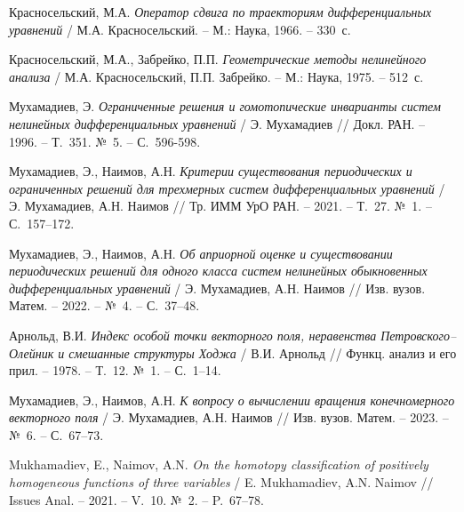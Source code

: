 \begin{thebibliography}{9} %

  Красносельский, М.А.   
{\it Оператор сдвига по траекториям дифференциальных уравнений}
/ М.А. Красносельский. --  М.: Наука, 1966. -- 330~с.

  Красносельский, М.А., Забрейко, П.П.    
{\it Геометрические методы нелинейного анализа}
/ М.А. Красносельский, П.П. Забрейко. --  М.: Наука, 1975. -- 512~с.

 Мухамадиев, Э. {\it Ограниченные решения и гомотопические
инварианты систем  нелинейных дифференциальных уравнений} 
/ Э. Мухамадиев // Докл. РАН. -- 1996. -- Т.~351. №~5. -- С.~596-598.

 Мухамадиев, Э., Наимов, А.Н. {\it Критерии существования периодических и ограниченных решений 
для трехмерных систем дифференциальных уравнений} 
/ Э. Мухамадиев, А.Н. Наимов // Тр. ИММ УрО РАН. -- 2021. -- Т.~27. №~1.
 -- С.~157–172.

 Мухамадиев, Э., Наимов, А.Н. {\it Об априорной оценке 
и существовании периодических решений для одного класса 
систем нелинейных обыкновенных дифференциальных уравнений} 
/ Э. Мухамадиев, А.Н. Наимов // Изв. вузов. Матем. -- 2022. -- №~4.
 -- С.~37–48.

 Арнольд, В.И. {\it Индекс особой точки векторного поля, неравенства 
Петровского–Олейник и смешанные структуры Ходжа} 
/ В.И. Арнольд // Функц. анализ и его прил. -- 1978. -- Т.~12. №~1.
 -- С.~1–14.
 
 Мухамадиев, Э., Наимов, А.Н. {\it К вопросу о вычислении 
вращения конечномерного векторного поля} 
/ Э. Мухамадиев, А.Н. Наимов // Изв. вузов. Матем. -- 2023. -- №~6.
 -- С.~67–73. 

 Mukhamadiev, E., Naimov, A.N. 
{\it On the homotopy classification of positively homogeneous 
functions of three variables} 
/ E. Mukhamadiev, A.N. Naimov // Issues Anal. -- 2021. -- V.~10. №~2.
 -- P.~67–78.

\end{thebibliography}





%